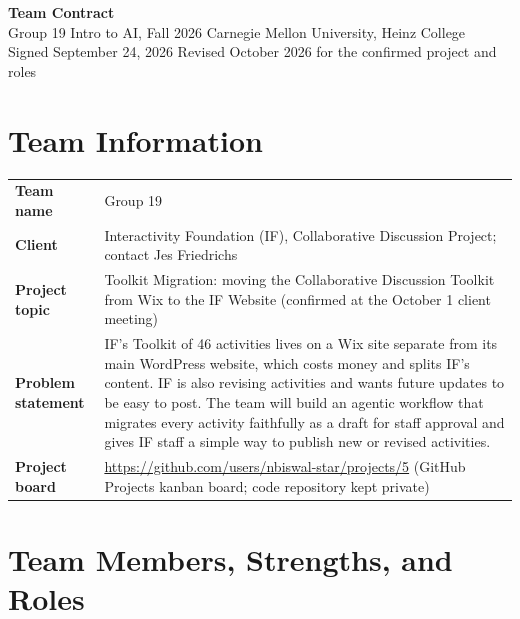 \documentclass[11pt]{article}
\begin{document}
\begin{center}
{\LARGE\bfseries Team Contract}\\[4pt]
{\large Group 19 \textbullet{} Intro to AI, Fall 2026 \textbullet{} Carnegie Mellon University, Heinz College}\\[2pt]
{\small Signed September 24, 2026 \textbullet{} Revised October 2026 for the confirmed project and roles}
\end{center}

\section{Team Information}

\begin{tabularx}{\textwidth}{@{}>{\bfseries}p{3.2cm}L@{}}
Team name & Group 19 \\
Client & Interactivity Foundation (IF), Collaborative Discussion Project; contact Jes Friedrichs \\
Project topic & Toolkit Migration: moving the Collaborative Discussion Toolkit from Wix to the IF Website (confirmed at the October 1 client meeting) \\
Problem statement & IF's Toolkit of 46 activities lives on a Wix site separate from its main WordPress website, which costs money and splits IF's content. IF is also revising activities and wants future updates to be easy to post. The team will build an agentic workflow that migrates every activity faithfully as a draft for staff approval and gives IF staff a simple way to publish new or revised activities. \\
Project board & \url{https://github.com/users/nbiswal-star/projects/5} (GitHub Projects kanban board; code repository kept private) \\
\end{tabularx}

\section{Team Members, Strengths, and Roles}
\end{document}
